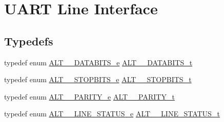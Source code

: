 \hypertarget{group__UART__LINE}{}\section{U\+A\+RT Line Interface}
\label{group__UART__LINE}
\subsection*{Typedefs}
\begin{DoxyCompactItemize}
\item 
typedef enum \mbox{\hyperlink{group__UART__LINE_ga8e9059237616c661191ac9fd517a812e}{A\+L\+T\+\_\+\_\+\+D\+A\+T\+A\+B\+I\+T\+S\+\_\+e}} \mbox{\hyperlink{group__UART__LINE_ga1e6b5e04034d586d0a66297b152a43c4}{A\+L\+T\+\_\+\_\+\+D\+A\+T\+A\+B\+I\+T\+S\+\_\+t}}
\item 
typedef enum \mbox{\hyperlink{group__UART__LINE_ga737333dc2e06f30e344ca799a37c91b8}{A\+L\+T\+\_\+\_\+\+S\+T\+O\+P\+B\+I\+T\+S\+\_\+e}} \mbox{\hyperlink{group__UART__LINE_gaf2b594c54a5c750b62111afe25088c81}{A\+L\+T\+\_\+\_\+\+S\+T\+O\+P\+B\+I\+T\+S\+\_\+t}}
\item 
typedef enum \mbox{\hyperlink{group__UART__LINE_ga8ac3151dbe5902aca34e2a07ff9747b1}{A\+L\+T\+\_\+\_\+\+P\+A\+R\+I\+T\+Y\+\_\+e}} \mbox{\hyperlink{group__UART__LINE_ga40ed81a89ceaf6e4ef0ec49c16415bf3}{A\+L\+T\+\_\+\_\+\+P\+A\+R\+I\+T\+Y\+\_\+t}}
\item 
typedef enum \mbox{\hyperlink{group__UART__LINE_ga9bd71509496adb0f07549c10d42ff745}{A\+L\+T\+\_\+\_\+\+L\+I\+N\+E\+\_\+\+S\+T\+A\+T\+U\+S\+\_\+e}} \mbox{\hyperlink{group__UART__LINE_ga2ce8b3524fc9491e21758f2f7bef7557}{A\+L\+T\+\_\+\_\+\+L\+I\+N\+E\+\_\+\+S\+T\+A\+T\+U\+S\+\_\+t}}
\end{DoxyCompactItemize}
